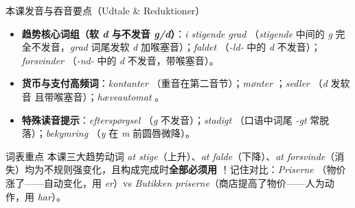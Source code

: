 \begin{tipbox}{本课发音与吞音要点（Udtale \& Reduktioner）}
\begin{itemize}
  \item \textbf{趋势核心词组（软 \textit{d} 与不发音 \textit{g/d}）}：\textit{i stigende grad} （\textit{stigende} 中间的 \textit{g} 完全不发音，\textit{grad} 词尾发软 \textit{d} 加喉塞音）；\textit{faldet} （\textit{-ld-} 中的 \textit{d} 不发音）；\textit{forsvinder} （\textit{-nd-} 中的 \textit{d} 不发音，带喉塞音）。
  \item \textbf{货币与支付高频词}：\textit{kontanter} （重音在第二音节）；\textit{mønter} ；\textit{sedler} （\textit{d} 发软音  且带喉塞音）；\textit{hæveautomat} 。
  \item \textbf{特殊读音提示}：\textit{efterspørgsel} （\textit{g} 不发音）；\textit{stadigt} （口语中词尾 \textit{-gt} 常脱落）；\textit{bekymring} （\textit{y} 在 \textit{m} 前圆唇微降）。
\end{itemize}
\end{tipbox}


\begin{tipbox}{词表重点}
本课三大趋势动词 \textit{at stige}（上升）、\textit{at falde}（下降）、\textit{at forsvinde}（消失）均为不规则强变化，且构成完成时\textbf{全部必须用 \dabold{[er]}}！记住对比：\textit{Priserne }（物价涨了——自动变化，用 \textit{er}）vs \textit{Butikken  priserne}（商店提高了物价——人为动作，用 \textit{har}）。
\end{tipbox}

